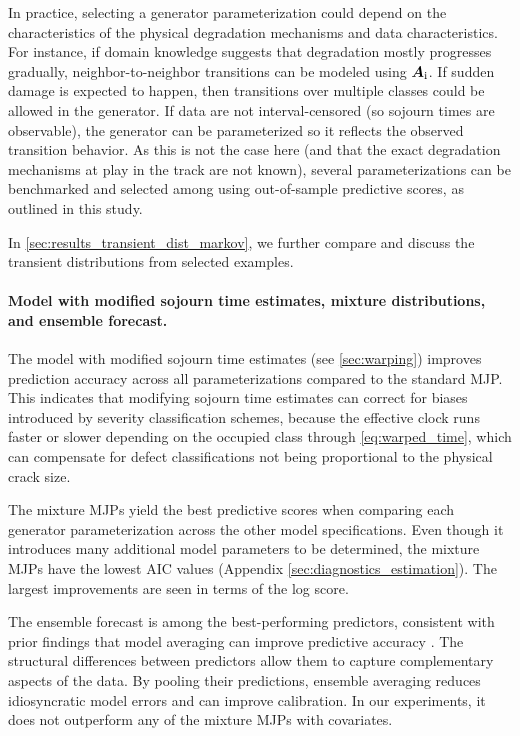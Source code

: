 \documentclass{article}
\newcommand{\RN}[1]{\textup{\uppercase\expandafter{\romannumeral#1}}}
\begin{document}
In practice, selecting a generator parameterization could depend on the characteristics of the physical degradation mechanisms and data characteristics. For instance, if domain knowledge suggests that degradation mostly progresses gradually, neighbor-to-neighbor transitions can be modeled using $\bm{A}_{\RN{1}}$. If sudden damage is expected to happen, then transitions over multiple classes could be allowed in the generator.
If data are not interval-censored (so sojourn times are observable), the generator can be parameterized so it reflects the observed transition behavior. As this is not the case here (and that the exact degradation mechanisms at play in the track are not known), several parameterizations can be benchmarked and selected among using out-of-sample predictive scores, as outlined in this study.

In \cref{sec:results_transient_dist_markov}, we further compare and discuss the transient distributions from selected examples.



\paragraph{Model with modified sojourn time estimates, mixture distributions, and ensemble forecast.}
The model with modified sojourn time estimates (see \cref{sec:warping}) improves prediction accuracy across all parameterizations compared to the standard MJP. This indicates that modifying sojourn time estimates can correct for biases introduced by severity classification schemes, because the effective clock runs faster or slower depending on the occupied class through \cref{eq:warped_time}, which can compensate for defect classifications not being proportional to the physical crack size.

The mixture MJPs yield the best predictive scores when comparing each generator parameterization across the other model specifications. Even though it introduces many additional model parameters to be determined, the mixture MJPs have the lowest AIC values (Appendix \ref{sec:diagnostics_estimation}). The largest improvements are seen in terms of the log score.

The ensemble forecast is among the best-performing predictors, consistent with prior findings that model averaging can improve predictive accuracy \citep{wu2021a}. The structural differences between predictors allow them to capture complementary aspects of the data. By pooling their predictions, ensemble averaging reduces idiosyncratic model errors and can improve calibration. In our experiments, it does not outperform any of the mixture MJPs with covariates.
\end{document}
